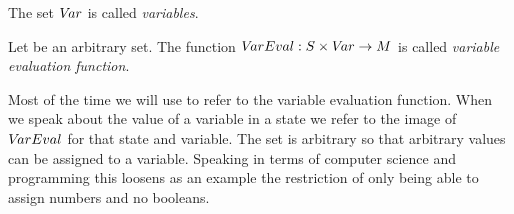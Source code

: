 \documentclass[preview]{standalone}
\begin{document}
%
%
%

\begin{definition}
	The set ${V\!ar}$ is called \emph{variables}.
\end{definition}

\begin{definition}
	Let \varevalimg be an arbitrary set. The function ${V\!arEval} : {S} \times {V\!ar} \to {\ensuremath{{M}}}$ is called \emph{variable evaluation function}.
\end{definition} 

Most of the time we will use \vareval to refer to the variable evaluation function. When we speak about the value of a variable in a state we refer to the image of ${V\!arEval}$ for that state and variable. The set \varevalimg is arbitrary so that arbitrary values can be assigned to a variable. Speaking in terms of computer science and programming this loosens as an example the restriction of only being able to assign numbers and no booleans.
\end{document}
